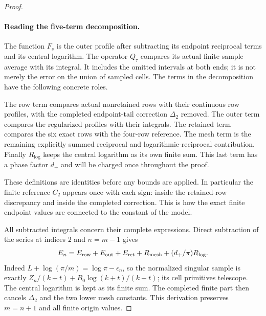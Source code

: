 \begin{proof}
\paragraph{Reading the five-term decomposition.}
The function $F_s$ is the outer profile after subtracting its endpoint
reciprocal terms and its central logarithm. The operator $Q_\tau$
compares its actual finite sample average with its integral. It includes
the omitted intervals at both ends; it is not merely the error on the
union of sampled cells. The terms in the decomposition have the
following concrete roles.

The row term compares actual nonretained rows with their continuous
row profiles, with the completed endpoint-tail correction $\Delta_2$
removed. The outer term compares the regularized profiles with their
integrals. The retained term compares the six exact rows with the
four-row reference. The mesh term is the remaining explicitly summed
reciprocal and logarithmic-reciprocal contribution. Finally $R_{\log}$
keeps the central logarithm as its own finite sum. This last term has a
phase factor $d_+$ and will be charged once throughout the proof.

These definitions are identities before any bounds are applied. In
particular the finite reference $C_2$ appears once with each sign:
inside the retained-row discrepancy and inside the completed correction.
This is how the exact finite endpoint values are connected to the
constant of the model.

All subtracted integrals concern their complete expressions. Direct
subtraction of the series at indices $2$ and $n=m-1$ gives
\begin{equation}\label{uc:telescope}
 E_n=E_{\rm row}+E_{\rm out}+E_{\rm ret}+R_{\rm mesh}
                       +(d_+/\pi)R_{\log}.
\end{equation}
Indeed $L+\log(\pi/m)=\log\pi-\epsilon_n$, so the normalized
singular sample is exactly $Z_n/(k+t)+B_0\log(k+t)/(k+t)$; its cell primitives telescope.
The central logarithm is kept as its finite sum. The completed
finite part then cancels $\Delta_2$ and the two lower mesh constants.
This derivation preserves $m=n+1$ and all finite origin values.


\end{proof}

